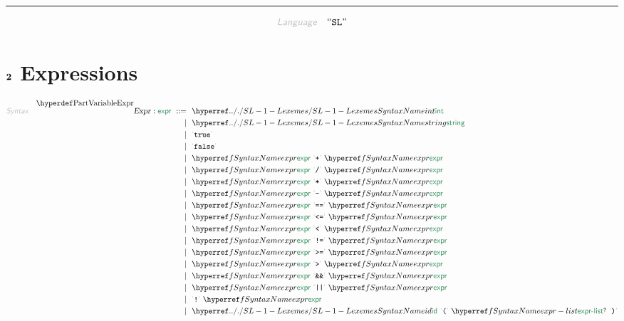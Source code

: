 

\begin{center}
\rule{3in}{0.4pt}
\end{center}

\begin{displaymath}
\KEY{Language} \quad \STRING{SL}
\end{displaymath}

\section{$\SECT{2}$ Expressions}\hypertarget{sect2-expressions}{}\label{sect2-expressions}

\begin{align*}
  \KEY{Syntax} \quad
    \VARDECL{Expr} : \SYN{expr}
      \ ::= \ & \
      \SYNHYPER{../.}{SL-1-Lexemes}{int} \\
      \ \mid \ & \ \SYNHYPER{../.}{SL-1-Lexemes}{string} \\
      \ \mid \ & \ \LEX{true} \\
      \ \mid \ & \ \LEX{false} \\
      \ \mid \ & \ \SYNREF{expr} \ \LEX{{+}} \ \SYNREF{expr} \\
      \ \mid \ & \ \SYNREF{expr} \ \LEX{{/}} \ \SYNREF{expr} \\
      \ \mid \ & \ \SYNREF{expr} \ \LEX{{*}} \ \SYNREF{expr} \\
      \ \mid \ & \ \SYNREF{expr} \ \LEX{{-}} \ \SYNREF{expr} \\
      \ \mid \ & \ \SYNREF{expr} \ \LEX{{=}{=}} \ \SYNREF{expr} \\
      \ \mid \ & \ \SYNREF{expr} \ \LEX{{<}{=}} \ \SYNREF{expr} \\
      \ \mid \ & \ \SYNREF{expr} \ \LEX{{<}} \ \SYNREF{expr} \\
      \ \mid \ & \ \SYNREF{expr} \ \LEX{{!}{=}} \ \SYNREF{expr} \\
      \ \mid \ & \ \SYNREF{expr} \ \LEX{{>}{=}} \ \SYNREF{expr} \\
      \ \mid \ & \ \SYNREF{expr} \ \LEX{{>}} \ \SYNREF{expr} \\
      \ \mid \ & \ \SYNREF{expr} \ \LEX{{\AMPERSAND}{\AMPERSAND}} \ \SYNREF{expr} \\
      \ \mid \ & \ \SYNREF{expr} \ \LEX{{|}{|}} \ \SYNREF{expr} \\
      \ \mid \ & \ \LEX{{!}} \ \SYNREF{expr} \\
      \ \mid \ & \ \SYNHYPER{../.}{SL-1-Lexemes}{id} \ \LEX{{(}} \ \SYNREF{expr-list}\QUERY \ \LEX{{)}} \\

\end{align*}
